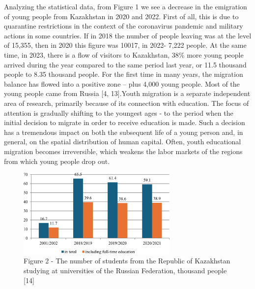 \begin{multicols}{2}
Analyzing the statistical data, from Figure 1 we see a decrease in the
emigration of young people from Kazakhstan in 2020 and 2022. First of
all, this is due to quarantine restrictions in the context of the
coronavirus pandemic and military actions in some countries. If in 2018
the number of people leaving was at the level of 15,355, then in 2020
this figure was 10017, in 2022- 7,222 people. At the same time, in 2023,
there is a flow of visitors to Kazakhstan, 38\% more young people
arrived during the year compared to the same period last year, or 11.5
thousand people to 8.35 thousand people. For the first time in many
years, the migration balance has flowed into a positive zone -- plus
4,000 young people. Most of the young people came from Russia {[}4,
13{]}.Youth migration is a separate independent area of research,
primarily because of its connection with education. The focus of
attention is gradually shifting to the youngest ages - to the period
when the initial decision to migrate in order to receive education is
made. Such a decision has a tremendous impact on both the subsequent
life of a young person and, in general, on the spatial distribution of
human capital. Often, youth educational migration becomes irreversible,
which weakens the labor markets of the regions from which young people
drop out.
\end{multicols}

\begin{figure}[H]
	\centering
	\includegraphics[width=0.7\textwidth]{media/ekon/Graph_5}
	\caption*{Figure 2 - The number of students from the Republic of Kazakhstan studying at universities of the Russian Federation, thousand people {[}14{]}}
\end{figure}

